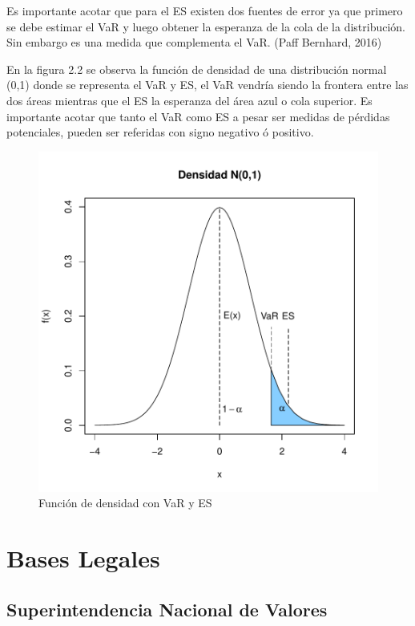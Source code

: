 \documentclass[a4paper,12pt]{Latex/Classes/PhDthesisPSnPDF}
\begin{document}
Es importante acotar que para el ES existen dos fuentes de error ya que primero se debe estimar el VaR y luego obtener la esperanza de la cola de la distribución. Sin embargo es una medida que complementa el VaR.  (Paff Bernhard, 2016)

En la figura 2.2 se observa la función de densidad de una distribución normal (0,1) donde se representa el VaR y ES, el VaR vendría siendo la frontera entre las dos áreas mientras que el ES la esperanza del área azul o cola superior. Es importante acotar que tanto el VaR como ES a pesar ser medidas de pérdidas potenciales, pueden ser referidas con signo negativo ó positivo.

\begin{figure}[H]
\centering
\includegraphics{main-001}
\caption{Función de densidad con VaR y ES}
\end{figure}

\section{Bases Legales}

\subsection{Superintendencia Nacional de Valores}
\end{document}
